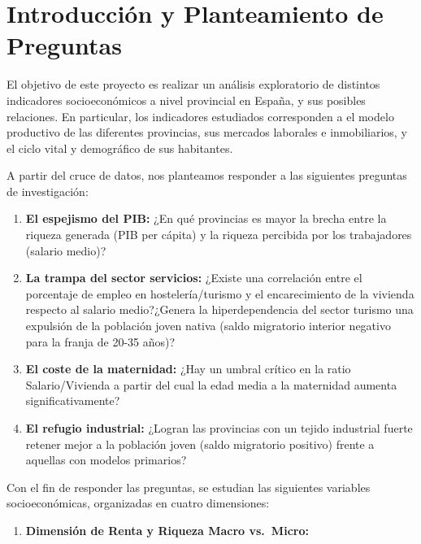 \documentclass[data,article,submit,moreauthors,pdftex]{Definitions/mdpi}
\providecommand{\tightlist}{%
  \setlength{\itemsep}{0pt}\setlength{\parskip}{0pt}}
\begin{document}

\section{Introducción y Planteamiento de
Preguntas}\label{introducciuxf3n-y-planteamiento-de-preguntas}

El objetivo de este proyecto es realizar un análisis exploratorio de
distintos indicadores socioeconómicos a nivel provincial en España, y
sus posibles relaciones. En particular, los indicadores estudiados
corresponden a el modelo productivo de las diferentes provincias, sus
mercados laborales e inmobiliarios, y el ciclo vital y demográfico de
sus habitantes.

A partir del cruce de datos, nos planteamos responder a las siguientes
preguntas de investigación:

\begin{enumerate}
\def\labelenumi{\arabic{enumi}.}
\item
  \textbf{El espejismo del PIB:} ¿En qué provincias es mayor la brecha
  entre la riqueza generada (PIB per cápita) y la riqueza percibida por
  los trabajadores (salario medio)?
\item
  \textbf{La trampa del sector servicios:} ¿Existe una correlación entre
  el porcentaje de empleo en hostelería/turismo y el encarecimiento de
  la vivienda respecto al salario medio?¿Genera la hiperdependencia del
  sector turismo una expulsión de la población joven nativa (saldo
  migratorio interior negativo para la franja de 20-35 años)?
\item
  \textbf{El coste de la maternidad:} ¿Hay un umbral crítico en la ratio
  Salario/Vivienda a partir del cual la edad media a la maternidad
  aumenta significativamente?
\item
  \textbf{El refugio industrial:} ¿Logran las provincias con un tejido
  industrial fuerte retener mejor a la población joven (saldo migratorio
  positivo) frente a aquellas con modelos primarios?
\end{enumerate}

Con el fin de responder las preguntas, se estudian las siguientes
variables socioeconómicas, organizadas en cuatro dimensiones:

\begin{enumerate}
\def\labelenumi{\arabic{enumi}.}
\tightlist
\item
  \textbf{Dimensión de Renta y Riqueza Macro vs.~Micro:}
\end{enumerate}
\end{document}
